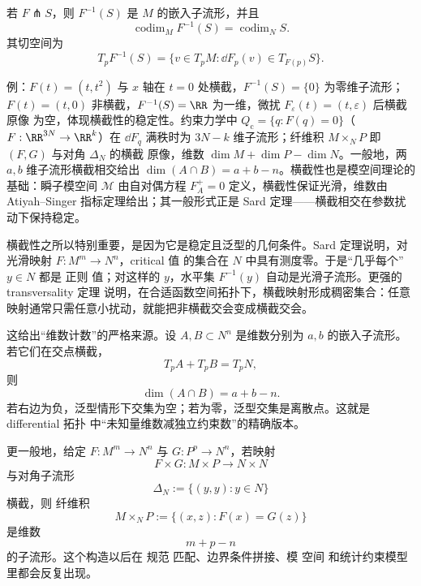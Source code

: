 \begin{theorem}\label{thm:math-dg-preimage-transverse}
若 $F\pitchfork S$，则 $F^{-1}(S)$ 是 $M$ 的嵌入子流形，并且
\begin{equation}
\operatorname{codim}_M F^{-1}(S)
=\operatorname{codim}_N S.
\label{eq:math-dg-transverse-codimension}
\end{equation}
其切空间为
\begin{equation}
T_pF^{-1}(S)
=\{v\in T_pM:\dd F_p(v)\in T_{F(p)}S\}.
\label{eq:math-dg-transverse-tangent-space}
\end{equation}
\end{theorem}

例：$F(t)=(t,t^2)$ 与 $x$ 轴在 $t=0$ 处横截，$F^{-1}(S)=\{0\}$ 为零维子流形；$F(t)=(t,0)$ 非横截，$F^{-1}(S)=\RR$ 为一维，微扰 $F_\varepsilon(t)=(t,\varepsilon)$ 后横截 原像 为空，体现横截性的稳定性。约束力学中 $Q_{\mathrm c}=\{q:F(q)=0\}$（$F:\RR^{3N}\to\RR^k$）在 $\dd F_q$ 满秩时为 $3N-k$ 维子流形；纤维积 $M\times_NP$ 即 $(F,G)$ 与对角 $\Delta_N$ 的横截 原像，维数 $\dim M+\dim P-\dim N$。一般地，两 $a,b$ 维子流形横截相交给出 $\dim(A\cap B)=a+b-n$。横截性也是模空间理论的基础：瞬子模空间 $\mathcal M$ 由自对偶方程 $F_A^+=0$ 定义，横截性保证光滑，维数由 Atiyah--Singer 指标定理给出；其一般形式正是 Sard 定理——横截相交在参数扰动下保持稳定。

横截性之所以特别重要，是因为它是稳定且泛型的几何条件。Sard 定理说明，对光滑映射 $F:M^m\to N^n$，critical 值 的集合在 $N$ 中具有测度零。于是“几乎每个” $y\in N$ 都是 正则 值；对这样的 $y$，水平集 $F^{-1}(y)$ 自动是光滑子流形。更强的 transversality 定理 说明，在合适函数空间拓扑下，横截映射形成稠密集合：任意映射通常只需任意小扰动，就能把非横截交会变成横截交会。

这给出“维数计数”的严格来源。设 $A,B\subset N^n$ 是维数分别为 $a,b$ 的嵌入子流形。若它们在交点横截，
\[
T_pA+T_pB=T_pN,
\]
则
\begin{equation*}\dim(A\cap B)=a+b-n.\end{equation*}
若右边为负，泛型情形下交集为空；若为零，泛型交集是离散点。这就是 differential 拓扑 中“未知量维数减独立约束数”的精确版本。

更一般地，给定 $F:M^m\to N^n$ 与 $G:P^p\to N^n$，若映射
\[
F\times G:M\times P\to N\times N
\]
与对角子流形
\[
\Delta_N:=\{(y,y):y\in N\}
\]
横截，则 纤维积
\begin{equation*}M\times_NP
:=\{(x,z):F(x)=G(z)\}\end{equation*}
是维数
\[
m+p-n
\]
的子流形。这个构造以后在 规范 匹配、边界条件拼接、模 空间 和统计约束模型里都会反复出现。

